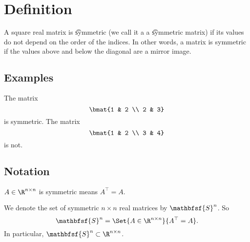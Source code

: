 
\section*{Definition}

A square real matrix is \t{symmetric} (we call it a a \t{symmetric matrix}) if its values do not depend on the order of the indices.
In other words, a matrix is symmetric if the values above and below the diagonal are a mirror image.

\subsection*{Examples}

The matrix
  \[
\bmat{1 & 2 \\ 2 & 3}
  \]
is symmetric.
The matrix
  \[
\bmat{1 & 2 \\ 3 & 4}
  \]
is not.

\subsection*{Notation}

$A \in \R ^{n \times n}$ is symmetric means $A^\top  = A$.

We denote the set of symmetric $n \times n$ real matrices by $\mathbfsf{S} ^n$.
So
  \[
\mathbfsf{S} ^n = \Set{A \in \R ^{n \times n}}{A^\top  = A}.
  \]
In particular, $\mathbfsf{S} ^n \subset \R ^{n \times n}$.

\blankpage